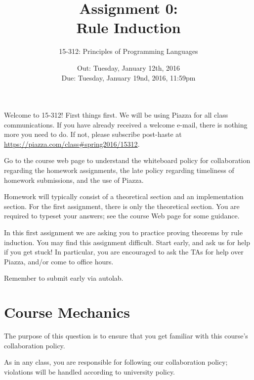 \documentclass[11pt]{article}
\title{Assignment 0: \\
       Rule Induction}
\author{15-312: Principles of Programming Languages}
\date{Out: Tuesday, January 12th, 2016 \\
      Due: Tuesday, January 19nd, 2016, 11:59pm}
\newcounter{rule}
\begin{document}
\newtheorem{theorem}{Theorem}
\newtheorem{lemma}[theorem]{Lemma}

\maketitle
Welcome to 15-312!  First things first.  We will be using Piazza for all class communications.  If you have already received a welcome e-mail, there is nothing more you need to do.  If not, please subscribe post-haste at
\url{https://piazza.com/class#spring2016/15312}.

Go to the course web page to understand the whiteboard policy for collaboration regarding the homework assignments, the late policy regarding timeliness of homework submissions, and the use of Piazza.

Homework will typically consist of a theoretical section and an implementation section.  For the first assignment, there is only the theoretical section.  You are required to typeset your answers; see the course Web page for some guidance.

In this first assignment we are asking you to practice proving theorems by rule induction.  You
may find this assignment difficult.    Start early, and ask us for
help if you get stuck!  In particular, you are encouraged to ask the
TAs for help over Piazza, and/or come to office hours.

Remember to submit early via autolab.


\section{Course Mechanics}

The purpose of this question is to ensure that you get familiar with
this course's collaboration policy.

As in any class, you are responsible for following our collaboration
policy; violations will be handled according to university policy.
\end{document}
